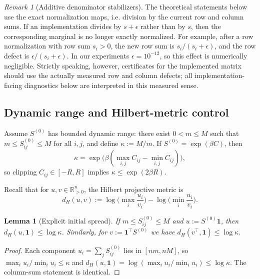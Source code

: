 \documentclass[11pt]{article}
\numberwithin{equation}{section}
\theoremstyle{plain}
\newtheorem{lemma}[theorem]{Lemma}
\theoremstyle{definition}
\theoremstyle{remark}
\newtheorem{remark}[theorem]{Remark}
\newcommand{\R}{\mathbb{R}}
\newcommand{\ones}{\mathbf{1}}
\begin{document}
\begin{remark}[Additive denominator stabilizers]
\label{rem:additive-stabilizers}
The theoretical statements below use the exact normalization maps, i.e. division by the current row and column sums. If an implementation divides by $s+\epsilon$ rather than by $s$, then the corresponding marginal is no longer exactly normalized. For example, after a row normalization with row sum $s_i>0$, the new row sum is $s_i/(s_i+\epsilon)$, and the row defect is $\epsilon/(s_i+\epsilon)$. In our experiments $\epsilon=10^{-12}$, so this effect is numerically negligible. Strictly speaking, however, certificates for the implemented matrix should use the actually measured row and column defects; all implementation-facing diagnostics below are interpreted in this measured sense.
\end{remark}

\subsection{Dynamic range and Hilbert-metric control}\label{subsec:hilbert}
Assume $S^{(0)}$ has bounded dynamic range: there exist $0<m\le M$ such that
$m\le S^{(0)}_{ij}\le M$ for all $i,j$, and define $\kappa:=M/m$. If $S^{(0)}=\exp(\beta C)$, then
\begin{equation}
\kappa=\exp\!\big(\beta(\max_{i,j} C_{ij}-\min_{i,j} C_{ij})\big),
\end{equation}
so clipping $C_{ij}\in[-R,R]$ implies $\kappa\le \exp(2\beta R)$.

Recall that for $u,v\in\R^n_{>0}$, the Hilbert projective metric is
\begin{equation}
d_H(u,v):=\log\Big(\max_i \frac{u_i}{v_i}\Big)-\log\Big(\min_i \frac{u_i}{v_i}\Big).
\end{equation}

\begin{lemma}[Explicit initial spread]\label{lem:hilbert}
If $m\le S^{(0)}_{ij}\le M$ and $u:=S^{(0)}\ones$, then $d_H(u,\ones)\le \log\kappa$.
Similarly, for $v:=\ones^\top S^{(0)}$ we have $d_H(v^\top,\ones)\le \log\kappa$.
\end{lemma}

\begin{proof}
Each component $u_i=\sum_j S^{(0)}_{ij}$ lies in $[nm,nM]$, so $\max_i u_i/\min_i u_i\le \kappa$ and
$d_H(u,\ones)=\log(\max_i u_i/\min_i u_i)\le \log\kappa$. The column-sum statement is identical.
\end{proof}
\end{document}
